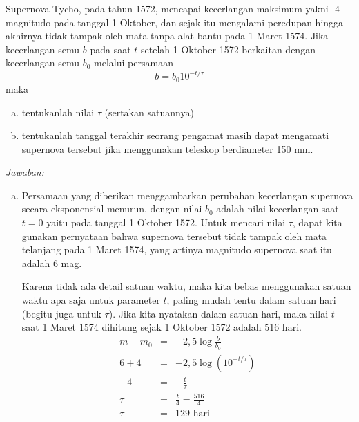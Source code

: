 \documentclass[11pt,fleqn]{exam}
\begin{document}
\bigskip
\begin{questions}

\question Supernova Tycho, pada tahun 1572, mencapai kecerlangan maksimum yakni -4 magnitudo pada tanggal 1 Oktober, dan sejak itu mengalami peredupan hingga akhirnya tidak tampak oleh mata tanpa alat bantu pada 1 Maret 1574. Jika kecerlangan semu $b$ pada saat $t$ setelah 1 Oktober 1572 berkaitan dengan kecerlangan semu $b_0$ melalui persamaan
\begin{equation*}
    b = b_0 10^{-t/\tau}
\end{equation*}
maka
\begin{enumerate}[a.]
    \item tentukanlah nilai $\tau$ (sertakan satuannya)
    \item tentukanlah tanggal terakhir seorang pengamat masih dapat mengamati supernova tersebut jika menggunakan teleskop berdiameter 150 mm.
\end{enumerate}


\newpage
\textit{Jawaban:}
\begin{enumerate}[a.]
    \item Persamaan yang diberikan menggambarkan perubahan kecerlangan supernova secara eksponensial menurun, dengan nilai $b_0$ adalah nilai kecerlangan saat $t=0$ yaitu pada tanggal 1 Oktober 1572. Untuk mencari nilai $\tau$, dapat kita gunakan pernyataan bahwa supernova tersebut tidak tampak oleh mata telanjang pada 1 Maret 1574, yang artinya magnitudo supernova saat itu adalah 6 mag. 

    Karena tidak ada detail satuan waktu, maka kita bebas menggunakan satuan waktu apa saja untuk parameter $t$, paling mudah tentu dalam satuan hari (begitu juga untuk $\tau$). Jika kita nyatakan dalam satuan hari, maka nilai $t$ saat 1 Maret 1574 dihitung sejak 1 Oktober 1572 adalah 516 hari.
    \begin{eqnarray*}
        m - m_0 &=& -2,5 \log{\frac{b}{b_0}}\\
        6 + 4 &=& -2,5 \log{\left( 10^{-t/\tau} \right)}\\
        -4 &=& -\frac{t}{\tau}\\
        \tau &=& \frac{t}{4} = \frac{516}{4}\\
        \tau &=& 129 \text{ hari}
    \end{eqnarray*}


\end{enumerate}
\end{questions}
\end{document}

